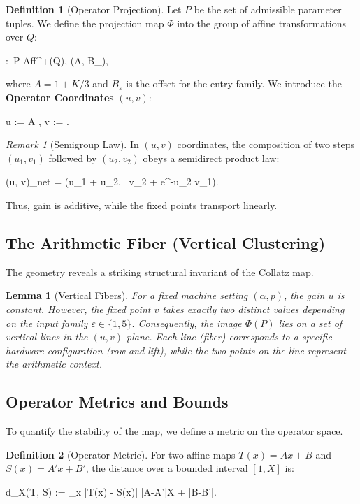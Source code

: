 \documentclass[11pt,letterpaper]{amsart}
\def\mathrm#1{#1}%
\def\mathcal#1{#1}%
\def\mathbb#1{#1}%
\def\[{ }%
\def\]{ }%
\theoremstyle{definition}
\newtheorem{definition}{Definition}
\theoremstyle{plain}
\newtheorem{lemma}{Lemma}
\theoremstyle{plain}
\theoremstyle{remark}
\newtheorem*{remark}{Remark}
\begin{document}
\begin{definition}[Operator Projection]
\label{def:phi}
Let $\mathcal{P}$ be the set of admissible parameter tuples. We define the projection map $\Phi$ into the group of affine transformations over $\mathbb{Q}$:
\[
\Phi:\ \mathcal{P} \longrightarrow \mathrm{Aff}^+(\mathbb{Q}), \qquad \Theta \mapsto (A, B_\varepsilon),
\]
where $A = 1 + K/3$ and $B_\varepsilon$ is the offset for the entry family.
We introduce the \textbf{Operator Coordinates} $(u, v)$:
\[
u \;:=\; \log A \quad {}, \qquad v \;:=\;  \quad {}.
\]
\end{definition}

\begin{remark}[Semigroup Law]
\label{rem:uv-law-2}
In $(u, v)$ coordinates, the composition of two steps $(u_1, v_1)$ followed by $(u_2, v_2)$ obeys a semidirect product law:
\[
(u, v)_{\mathrm{net}} \;=\; (u_1 + u_2, \ v_2 + e^{-u_2} v_1).
\]
Thus, gain is additive, while the fixed points transport linearly.
\end{remark}

\subsection{The Arithmetic Fiber (Vertical Clustering)}
The geometry reveals a striking structural invariant of the Collatz map.

\begin{lemma}[Vertical Fibers]
\label{lem:continuity-clusters}
For a fixed machine setting $(\alpha, p)$, the gain $u$ is constant. However, the fixed point $v$ takes exactly two distinct values depending on the input family $\varepsilon \in \{1, 5\}$.
Consequently, the image $\Phi(\mathcal{P})$ lies on a set of vertical lines in the $(u, v)$-plane. Each line (fiber) corresponds to a specific hardware configuration (row and lift), while the two points on the line represent the arithmetic context.
\end{lemma}


\subsection{Operator Metrics and Bounds}
To quantify the stability of the map, we define a metric on the operator space.

\begin{definition}[Operator Metric]
For two affine maps $T(x)=Ax+B$ and $S(x)=A'x+B'$, the distance over a bounded interval $[1, X]$ is:
\[
d_X(T, S) \;:=\; \sup_{x \in [1, X]} |T(x) - S(x)| \;\le\; |A-A'|X + |B-B'|.
\]
\end{definition}
\end{document}
